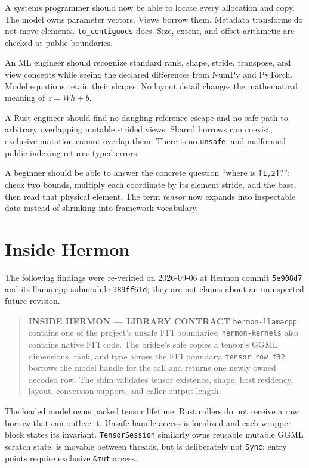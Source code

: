 A systems programmer should now be able to locate every allocation and
copy. The model owns parameter vectors. Views borrow them. Metadata
transforms do not move elements. \texttt{to\_contiguous} does. Size,
extent, and offset arithmetic are checked at public boundaries.

An ML engineer should recognize standard rank, shape, stride, transpose,
and view concepts while seeing the declared differences from NumPy and
PyTorch. Model equations retain their shapes. No layout detail changes
the mathematical meaning of \(z=Wh+b\).

A Rust engineer should find no dangling reference escape and no safe
path to arbitrary overlapping mutable strided views. Shared borrows can
coexist; exclusive mutation cannot overlap them. There is no
\texttt{unsafe}, and malformed public indexing returns typed errors.

A beginner should be able to answer the concrete question ``where is
\texttt{{[}1,2{]}}?'': check two bounds, multiply each coordinate by its
element stride, add the base, then read that physical element. The term
\emph{tensor} now expands into inspectable data instead of shrinking
into framework vocabulary.

\section{Inside Hermon}\label{inside-hermon-1}

The following findings were re-verified on 2026-09-06 at Hermon commit
\texttt{5e908d7} and its llama.cpp submodule \texttt{389ff61d}; they are
not claims about an uninspected future revision.

\begin{quote}
\textbf{INSIDE HERMON --- LIBRARY CONTRACT} \texttt{hermon-llamacpp}
contains one of the project's unsafe FFI boundaries;
\texttt{hermon-kernels} also contains native FFI code. The bridge's safe
\texttt{} copies a tensor's GGML
dimensions, rank, and type across the FFI boundary.
\texttt{tensor\_row\_f32} borrows the model handle for the call and
returns one newly owned decoded row. The shim validates tensor
existence, shape, host residency, layout, conversion support, and caller
output length.
\end{quote}

The loaded model owns packed tensor lifetime; Rust callers do not
receive a raw borrow that can outlive it. Unsafe handle access is
localized and each wrapper block states its invariant.
\texttt{TensorSession} similarly owns reusable mutable GGML scratch
state, is movable between threads, but is deliberately not
\texttt{Sync}; entry points require exclusive \texttt{\&mut} access.

